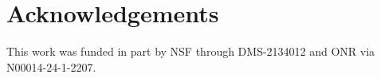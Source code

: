 \section{Acknowledgements}
This work was funded in part by NSF through DMS-2134012 and ONR via N00014-24-1-2207. 